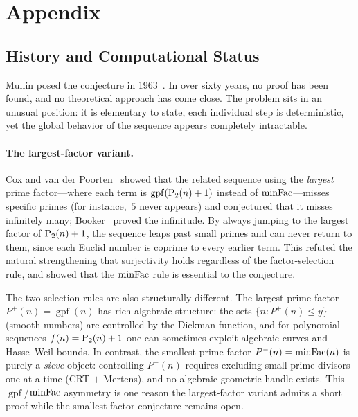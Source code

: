 \appendix

\section{Appendix}

\subsection{History and Computational Status}
\label{app:history}

Mullin posed the conjecture in 1963~\cite{Mullin1963}.  In over sixty
years, no proof has been found, and no theoretical approach has come
close.  The problem sits in an unusual position: it is elementary to
state, each individual step is deterministic, yet the global behavior
of the sequence appears completely intractable.

\paragraph{The largest-factor variant.}
Cox and van der Poorten~\cite{CoxVdP1968} showed that the related sequence using
the \emph{largest} prime factor---where each term is
$\operatorname{gpf}(\mathrm{P}_{2}(n) + 1)$ instead of $\mathrm{minFac}$---misses
specific primes (for instance,~$5$ never appears) and conjectured that
it misses infinitely many; Booker~\cite{Booker2012} proved the
infinitude.  By
always jumping to the largest factor of $\mathrm{P}_{2}(n) + 1$, the sequence
leaps past small primes and can never return to them, since each Euclid
number is coprime to every earlier term.  This refuted the natural
strengthening that surjectivity holds regardless of the factor-selection
rule, and showed that the $\mathrm{minFac}$ rule is essential to the conjecture.

The two selection rules are also structurally different.  The largest
prime factor $P^+(n) = \operatorname{gpf}(n)$ has rich algebraic
structure: the sets $\{n : P^+(n) \leq y\}$ (smooth numbers) are
controlled by the Dickman function, and for polynomial sequences
$f(n) = \mathrm{P}_{2}(n)+1$ one can sometimes exploit algebraic curves and
Hasse--Weil bounds.  In contrast, the smallest prime factor
$P^-(n) = \mathrm{minFac}(n)$ is purely a \emph{sieve} object: controlling
$P^-(n)$ requires excluding small prime divisors one at a time (CRT
$+$ Mertens), and no algebraic-geometric handle exists.  This
$\operatorname{gpf}$/$\mathrm{minFac}$ asymmetry is one reason the largest-factor
variant admits a short proof while the smallest-factor conjecture
remains open.

